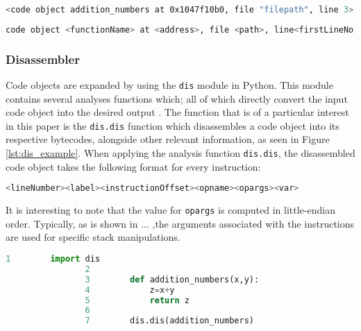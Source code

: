 {		\begin{lstlisting}[language=bash, caption= Code object of \ref{lst:dis_example},numbers=none]
			<code object addition_numbers at 0x1047f10b0, file "filepath", line 3>
		\end{lstlisting}\label{lst:codeobjscript}
		
		\small
		\begin{lstlisting}[language=bash, caption= Code object standard convention,numbers=none]
			code object <functionName> at <address>, file <path>, line<firstLineNo.>
		\end{lstlisting}\label{lst:codeobjconv}
		\normalsize

			\subsubsection*{Disassembler}
			\par Code objects are expanded by using the \lstinline|dis| module in Python. This module contains several analyses functions which; all of which directly convert the input code object into the desired output \cite[]{pythonofficial2022docsdismodule}.
			The function that is of a particular interest in this paper is the \lstinline|dis.dis| function which disassembles a code object into its respective bytecodes, alongside other relevant information, as seen in Figure \ref*{lst:dis_example}.
			When applying the analysis function \lstinline|dis.dis|, the disassembled code object takes the following format for every instruction:
			
			\small
			\begin{lstlisting}[language=bash, caption= Dissasembled instruction convention,numbers=none]
				<lineNumber><label><instructionOffset><opname><opargs><var>
			\end{lstlisting}
			\normalsize

			It is interesting to note that the value for \lstinline|opargs| is computed in little-endian order. Typically, as is shown in ... ,the arguments associated with the instructions are used for 
			specific stack manipulations. 

				
				\begin{lstlisting}[language=Python,caption=Python source code]
				1        import dis
				2        
				3        def addition_numbers(x,y):
				4            z=x+y
				5            return z
				6       
				7        dis.dis(addition_numbers)
				\end{lstlisting}\label{lst:sourcecode}

}
